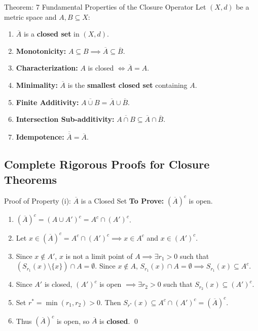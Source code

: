\documentclass[11pt,a4paper]{article}
\begin{document}
\begin{formulabox}{Theorem: 7 Fundamental Properties of the Closure Operator}
Let $(X, d)$ be a metric space and $A, B \subseteq X$:
\begin{enumerate}
    \item[\textbf{(i)}] $\overline{A}$ is a \textbf{closed set} in $(X, d)$.
    \item[\textbf{(ii)}] \textbf{Monotonicity:} $A \subseteq B \implies \overline{A} \subseteq \overline{B}$.
    \item[\textbf{(iii)}] \textbf{Characterization:} $A$ is closed $\iff \overline{A} = A$.
    \item[\textbf{(iv)}] \textbf{Minimality:} $\overline{A}$ is the \textbf{smallest closed set} containing $A$.
    \item[\textbf{(v)}] \textbf{Finite Additivity:} $\overline{A \cup B} = \overline{A} \cup \overline{B}$.
    \item[\textbf{(vi)}] \textbf{Intersection Sub-additivity:} $\overline{A \cap B} \subseteq \overline{A} \cap \overline{B}$.
    \item[\textbf{(vii)}] \textbf{Idempotence:} $\overline{\overline{A}} = \overline{A}$.
\end{enumerate}
\end{formulabox}

\subsection{Complete Rigorous Proofs for Closure Theorems}

\begin{exbox}{Proof of Property (i): $\overline{A}$ is a Closed Set}
\textbf{To Prove:} $(\overline{A})^c$ is open.
\begin{enumerate}
    \item $(\overline{A})^c = (A \cup A')^c = A^c \cap (A')^c$.
    \item Let $x \in (\overline{A})^c = A^c \cap (A')^c \implies x \in A^c$ and $x \in (A')^c$.
    \item Since $x \notin A'$, $x$ is not a limit point of $A \implies \exists r_1 > 0$ such that $(S_{r_1}(x) \setminus \{x\}) \cap A = \emptyset$. Since $x \notin A$, $S_{r_1}(x) \cap A = \emptyset \implies S_{r_1}(x) \subseteq A^c$.
    \item Since $A'$ is closed, $(A')^c$ is open $\implies \exists r_2 > 0$ such that $S_{r_2}(x) \subseteq (A')^c$.
    \item Set $r^* = \min(r_1, r_2) > 0$. Then $S_{r^*}(x) \subseteq A^c \cap (A')^c = (\overline{A})^c$.
    \item Thus $(\overline{A})^c$ is open, so $\overline{A}$ is \textbf{closed}. \qed
\end{enumerate}
\end{exbox}
\end{document}
